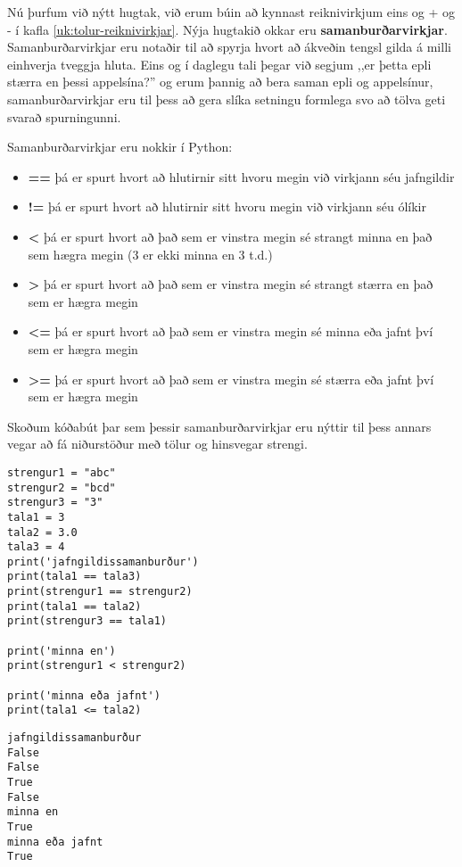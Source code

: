 Nú þurfum við nýtt hugtak, við erum búin að kynnast reiknivirkjum eins og + og - í kafla \ref{uk:tolur-reiknivirkjar}.
Nýja hugtakið okkar eru \textbf{samanburðarvirkjar}.
Samanburðarvirkjar eru notaðir til að spyrja hvort að ákveðin tengsl gilda á milli einhverja tveggja hluta.
Eins og í daglegu tali þegar við segjum ,,er þetta epli stærra en þessi appelsína?'' og erum þannig að bera saman epli og appelsínur, samanburðarvirkjar eru til þess að gera slíka setningu formlega svo að tölva geti svarað spurningunni.

Samanburðarvirkjar eru nokkir í Python:
\begin{itemize}
	\item[] \textbf{==} þá er spurt hvort að hlutirnir sitt hvoru megin við virkjann séu jafngildir
	\item[] \textbf{!=} þá er spurt hvort að hlutirnir sitt hvoru megin við virkjann séu ólíkir
	\item[] \textbf{<} þá er spurt hvort að það sem er vinstra megin sé strangt minna en það sem hægra megin (3 er ekki minna en 3 t.d.)
	\item[] \textbf{>} þá er spurt hvort að það sem er vinstra megin sé strangt stærra en það sem er hægra megin
	\item[] \textbf{<=} þá er spurt hvort að það sem er vinstra megin sé minna eða jafnt því sem er hægra megin
	\item[] \textbf{>=} þá er spurt hvort að það sem er vinstra megin sé stærra eða jafnt því sem er hægra megin
\end{itemize}

Skoðum kóðabút þar sem þessir samanburðarvirkjar eru nýttir til þess annars vegar að fá niðurstöður með tölur og hinsvegar strengi.
\begin{lstlisting}[caption=Samanburðarvirkjar, label=lst:bool-samanburður]
strengur1 = "abc"
strengur2 = "bcd"
strengur3 = "3"
tala1 = 3
tala2 = 3.0
tala3 = 4
print('jafngildissamanburður')
print(tala1 == tala3)
print(strengur1 == strengur2)
print(tala1 == tala2)
print(strengur3 == tala1)

print('minna en')
print(strengur1 < strengur2)

print('minna eða jafnt')
print(tala1 <= tala2)
\end{lstlisting}
\lstset{style=uttak}
\begin{lstlisting}
jafngildissamanburður
False
False
True
False
minna en
True
minna eða jafnt
True
\end{lstlisting}
\lstset{style=venjulegt}


